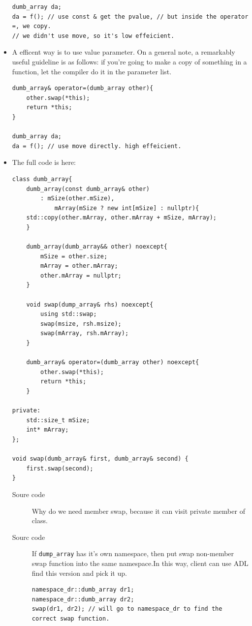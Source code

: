 \documentclass[a4paper,11pt,twoside]{book}
\begin{document}
\begin{itemize}
\begin{lstlisting}[numbers=none]
dumb_array da;
da = f(); // use const & get the pvalue, // but inside the operator =, we copy. 
// we didn't use move, so it's low effeicient.	
\end{lstlisting}
	
	\item  A efficent way is to use value parameter. On a general note, a remarkably useful guideline is as follows: if you're going to make a copy of something in a function, let the compiler do it in the parameter list.
	
\begin{lstlisting}[numbers=none]
dumb_array& operator=(dumb_array other){
	other.swap(*this); 
	return *this;
}	

dumb_array da;
da = f(); // use move directly. high effeicient.
\end{lstlisting}
	

\item The full code is here:
\begin{lstlisting}[numbers=none]
class dumb_array{
	dumb_array(const dumb_array& other)
		: mSize(other.mSize),
			mArray(mSize ? new int[mSize] : nullptr){
	std::copy(other.mArray, other.mArray + mSize, mArray);
	}

	dumb_array(dumb_array&& other) noexcept{
		mSize = other.size;
		mArray = other.mArray;
		other.mArray = nullptr;
	}

	void swap(dump_array& rhs) noexcept{
		using std::swap;
		swap(msize, rsh.msize);
		swap(mArray, rsh.mArray);
	}
	
	dumb_array& operator=(dumb_array other) noexcept{
		other.swap(*this); 
		return *this;
	}

private:
	std::size_t mSize;
	int* mArray;
};

void swap(dumb_array& first, dumb_array& second) {
	first.swap(second);
}
\end{lstlisting}
\begin{description}
    \item[Soure code] Why do we need member swap, because it can visit private member of class.

    \item[Sourc code] If \texttt{dump\_array} has it's own namespace, then put swap non-member swap function into the same namespace.In this way, client can use ADL find this version and pick it up.

\begin{lstlisting}
namespace_dr::dumb_array dr1;
namespace_dr::dumb_array dr2;
swap(dr1, dr2); // will go to namespace_dr to find the correct swap function.
\end{lstlisting}


\end{description}
\end{itemize}
\end{document}
